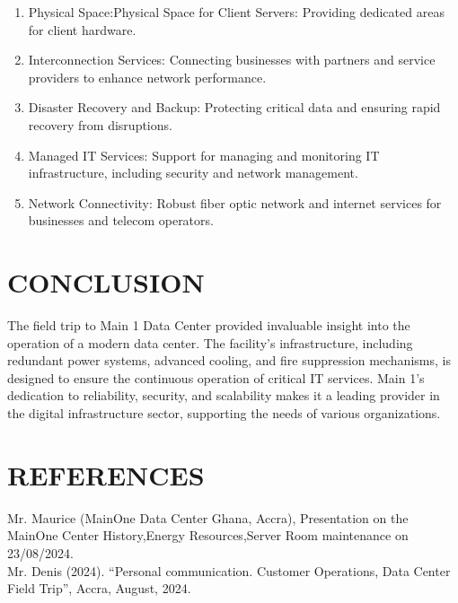 \documentclass[12pt]{report}
\begin{document}
\begin{flushleft}
\begin{enumerate}
    \item Physical Space:Physical Space for Client Servers: Providing dedicated areas for client hardware.

    \item Interconnection Services: Connecting businesses with partners and service providers to enhance network performance.

    \item Disaster Recovery and Backup: Protecting critical data and ensuring rapid recovery from disruptions.

    \item Managed IT Services: Support for managing and monitoring IT infrastructure, including security and network management.

    \item Network Connectivity: Robust fiber optic network and internet services for businesses and telecom operators.

   \end{enumerate}



\end{flushleft}



\chapter*{CONCLUSION}
\begin{flushleft}
	The field trip to Main 1 Data Center provided invaluable insight into the operation of a modern data center. The facility’s infrastructure, including redundant power systems, advanced cooling, and fire suppression mechanisms, is designed to ensure the continuous operation of critical IT services. Main 1’s dedication to reliability, security, and scalability makes it a leading provider in the digital infrastructure sector, supporting the needs of various organizations.
\end{flushleft}



\chapter*{REFERENCES}
 Mr. Maurice (MainOne Data Center Ghana, Accra), Presentation on the MainOne Center History,Energy Resources,Server Room maintenance on 23/08/2024.\\[0.6cm]
 Mr. Denis (2024). “Personal communication. Customer Operations, Data Center Field
 Trip”, Accra, August, 2024.
\end{document}
